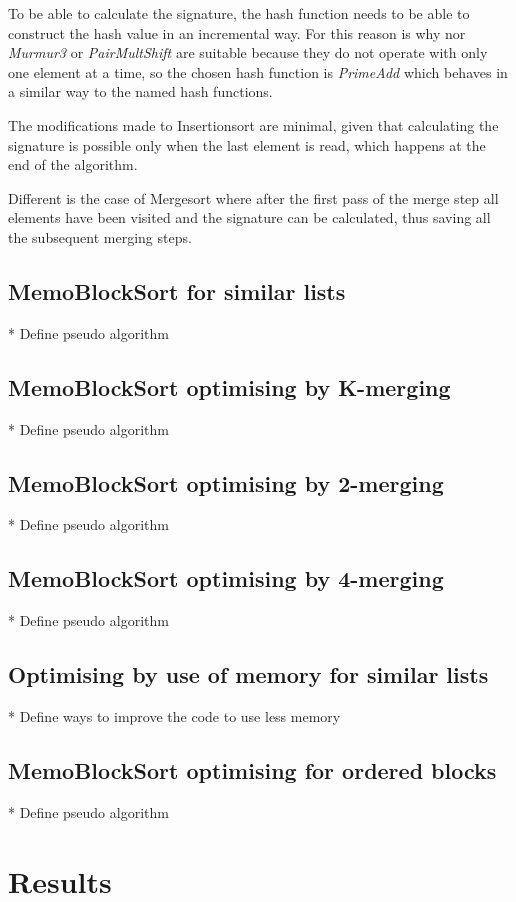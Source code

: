 \documentclass[a4paper,12pt]{article}
\begin{document}
To be able to calculate the signature, the hash function needs to be able to construct the hash value in an incremental way. For this reason is why nor {\it Murmur3} or {\it PairMultShift}  are suitable because they do not operate with only one element at a time, so the chosen hash function is {\it PrimeAdd} which behaves in a similar way to the named hash functions.

The modifications made to Insertionsort are minimal, given that calculating the signature is possible only when the last element is read, which happens at the end of the algorithm.

Different is the case of Mergesort where after the first pass of the merge step all elements have been visited and the signature can be calculated, thus saving all the subsequent merging steps.

\subsection{MemoBlockSort for similar lists}
* Define pseudo algorithm

\subsection{MemoBlockSort optimising by K-merging}
* Define pseudo algorithm

\subsection{MemoBlockSort optimising by 2-merging}
* Define pseudo algorithm

\subsection{MemoBlockSort optimising by 4-merging}
* Define pseudo algorithm

\subsection{Optimising by use of memory for similar lists}
* Define ways to improve the code to use less memory

\subsection{MemoBlockSort optimising for ordered blocks}
* Define pseudo algorithm

\section{Results}
\end{document}

